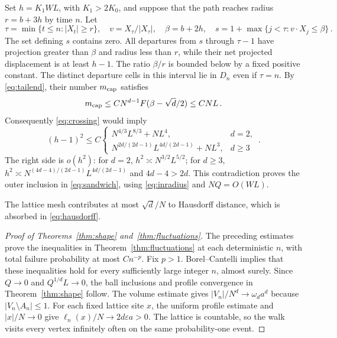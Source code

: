 \documentclass[11pt]{amsart}
\theoremstyle{plain}
\theoremstyle{definition}
\newcommand{\eps}{\varepsilon}
\begin{document}
Set $h=K_1WL$, with $K_1>2K_0$, and suppose that the path
reaches radius $r=b+3h$ by time $n$. Let
\[
 \tau=\min\{t\leq n:|X_t|\geq r\},\quad
 v=X_\tau/|X_\tau|,\quad \beta=b+2h,
 \quad s=1+\max\{j<\tau:v\cdot X_j\leq\beta\}\, .
\]
The set defining $s$ contains zero. All departures from $s$ through
$\tau-1$ have projection greater than $\beta$ and radius less than
$r$, while their net projected displacement is at least $h-1$.
The ratio $\beta/r$ is bounded below by a fixed positive constant.
The distinct departure cells in this interval lie in $D_n$ even
if $\tau=n$. By \eqref{eq:tailend}, their number $m_{\rm cap}$ satisfies
\[
 m_{\rm cap}\leq CN^{d-1}F(\beta-\sqrt d/2)
              \leq CNL\, .
\]
Consequently \eqref{eq:crossing} would imply
\begin{equation}\label{eq:outer-contradiction}
 (h-1)^2\leq C
 \begin{cases}
 N^{4/3}L^{8/3}+NL^4,&d=2,\\
 N^{2d/(2d-1)}L^{4d/(2d-1)}+NL^3,&d\geq3
 \end{cases}\, .
\end{equation}
The right side is $o(h^2)$: for $d=2$,
$h^2\asymp N^{3/2}L^{5/2}$; for $d\geq3$,
$h^2\asymp N^{(4d-4)/(2d-1)}L^{4d/(2d-1)}$ and
$4d-4>2d$. This contradiction proves the outer inclusion in
\eqref{eq:sandwich}, using \eqref{eq:inradius} and $NQ=O(WL)$.

The lattice mesh contributes at most $\sqrt d/N$ to Hausdorff distance,
which is absorbed in \eqref{eq:hausdorff}.



\begin{proof}[Proof of Theorems~\ref{thm:shape} and~\ref{thm:fluctuations}]
The preceding estimates prove the inequalities in
Theorem~\ref{thm:fluctuations} at each deterministic $n$, with total
failure probability at most $Cn^{-p}$. Fix $p>1$. Borel--Cantelli
implies that these inequalities hold for every sufficiently large
integer $n$, almost surely. Since $Q\to0$ and $Q^{1/d}L\to0$,
the ball inclusions and profile convergence in Theorem~\ref{thm:shape}
follow. The volume estimate gives $|V_n|/N^d\to\omega_da^d$ because
$|V_n\setminus A_n|\leq1$. For each fixed lattice site $x$,
the uniform profile estimate and $|x|/N\to0$ give
$\ell_n(x)/N\to2d\eps a>0$. The lattice is countable, so the
walk visits every vertex infinitely often on the same probability-one event.
\end{proof}



\end{document}
